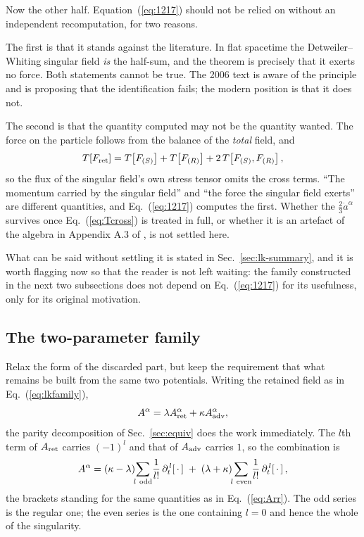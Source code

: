 \documentclass[preprint]{aastex701}
\newcommand{\Aret}{A^\alpha_{\rm ret}}
\newcommand{\Aadv}{A^\alpha_{\rm adv}}
\begin{document}
Now the other half. Equation~(\ref{eq:1217}) should not be relied on without an
independent recomputation, for two reasons.

The first is that it stands against the literature. In flat spacetime the
Detweiler--Whiting singular field \emph{is} the half-sum, and the theorem
\citep{detweiler_whiting2003} is precisely that it exerts no force. Both
statements cannot be true. The 2006 text is aware of the principle and is
proposing that the identification fails; the modern position is that it does
not.

The second is that the quantity computed may not be the quantity wanted. The
force on the particle follows from the balance of the \emph{total} field, and
\begin{equation}
T\!\left[F_{\rm ret}\right]
= T\!\left[F_{(S)}\right] + T\!\left[F_{(R)}\right]
  + 2\,T\!\left[F_{(S)},F_{(R)}\right],
\label{eq:Tcross}
\end{equation}
so the flux of the singular field's own stress tensor omits the cross terms.
``The momentum carried by the singular field'' and ``the force the singular
field exerts'' are different quantities, and Eq.~(\ref{eq:1217}) computes the
first. Whether the $\tfrac23\dot a^\alpha$ survives once
Eq.~(\ref{eq:Tcross}) is treated in full, or whether it is an artefact of the
algebra in Appendix A.3 of \citet{zhang2006}, is not settled here.

What can be said without settling it is stated in
Sec.~\ref{sec:lk-summary}, and it is worth flagging now so that the reader is
not left waiting: the family constructed in the next two subsections does not
depend on Eq.~(\ref{eq:1217}) for its usefulness, only for its original
motivation.

\subsection{The two-parameter family}
\label{sec:lkfam}

Relax the form of the discarded part, but keep the requirement that what
remains be built from the same two potentials. Writing the retained field as in
Eq.~(\ref{eq:lkfamily}),
\begin{equation*}
A^\alpha = \lambda \Aret + \kappa \Aadv ,
\end{equation*}
the parity decomposition of Sec.~\ref{sec:equiv} does the work immediately.
The $l$th term of $A_{\rm ret}$ carries $(-1)^l$ and that of $A_{\rm adv}$
carries $1$, so the combination is
\begin{equation}
A^\alpha
= (\kappa-\lambda)\!\!\sum_{l\ \rm odd}\!\frac{1}{l!}\,
   \partial_t^{\,l}\!\left[\,\cdot\,\right]
\;+\;
  (\lambda+\kappa)\!\!\sum_{l\ \rm even}\!\frac{1}{l!}\,
   \partial_t^{\,l}\!\left[\,\cdot\,\right],
\label{eq:lkparity}
\end{equation}
the brackets standing for the same quantities as in Eq.~(\ref{eq:Arr}). The
odd series is the regular one; the even series is the one containing $l=0$ and
hence the whole of the singularity.
\end{document}
